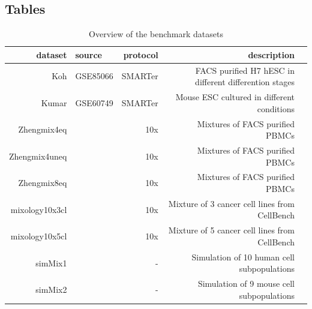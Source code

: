 \documentclass{bmcart}
\begin{document}
\begin{backmatter}

% 


\section*{Tables}

\begin{table}[h!]
\caption{Overview of the benchmark datasets}
\label{tab:table1}
\begin{tabular}{rlrrl}
  \hline
dataset & source & protocol & description \\ 
  \hline
Koh & GSE85066 & SMARTer & FACS purified H7 hESC in different differention stages \\ 
  Kumar & GSE60749 & SMARTer & Mouse ESC cultured in different conditions \\ 
  Zhengmix4eq & \citep{duoClustering2018} & 10x & Mixtures of FACS purified PBMCs \\ 
  Zhengmix4uneq & \citep{duoClustering2018} & 10x & Mixtures of FACS purified PBMCs \\ 
  Zhengmix8eq & \citep{duoClustering2018} & 10x & Mixtures of FACS purified PBMCs \\ 
  mixology10x3cl & \cite{tianMixology2018} & 10x & Mixture of 3  cancer cell lines from CellBench \\ 
  mixology10x5cl & \cite{tianMixology2018} & 10x & Mixture of 5 cancer cell lines from CellBench \\ 
  simMix1 & \cite{CrowellMuscat2019} & - & Simulation of 10 human cell subpopulations \\
  simMix2 & \cite{CrowellMuscat2019} & - & Simulation of 9 mouse cell subpopulations \\
   \hline
\end{tabular}
\end{table}


\end{backmatter}
\end{document}
